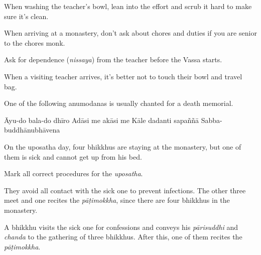 \begin{exam}{\autoExamName}
\begin{problem*}
\begin{parts}
  \item {} When washing the teacher's bowl, lean into the effort and scrub
    it hard to make sure it's clean.

  \item {} When arriving at a monastery, don't ask about chores and duties
    if you are senior to the chores monk.

  \item {} Ask for dependence (\textit{nissaya}) from the teacher before the
    Vassa starts.

  \item {} When a visiting teacher arrives, it's better not to touch their
    bowl and travel bag.

\end{parts}

\end{problem*}

\clearpage

\begin{problem}

\item One of the following anumodanas is usually chanted for a death memorial.

  \bigskip

  \begin{answers}{1}
    \bChoices
     Āyu-do bala-do dhīro\eAns
     Adāsi me akāsi me\eAns
     Kāle dadanti sapaññā\eAns
     Sabba-buddhānubhāvena\eAns
    \eChoices
  \end{answers}

\end{problem}

\begin{problem}

  On the uposatha day, four bhikkhus are staying at the monastery, but one of
  them is sick and cannot get up from his bed.

  Mark all correct procedures for the \emph{uposatha}.

  \bigskip

  \begin{manswers}{1}
    \bChoices

     They avoid all contact with the sick one to prevent infections. The
    other three meet and one recites the \emph{pāṭimokkha}, since there are four
    bhikkhus in the monastery.\eAns

     A bhikkhu visits the sick one for confessions and conveys his
    \emph{pārisuddhi} and \emph{chanda} to the gathering of three bhikkhus.
    After this, one of them recites the \emph{pāṭimokkha}.\eAns


\end{manswers}
\end{problem}
\end{exam}
